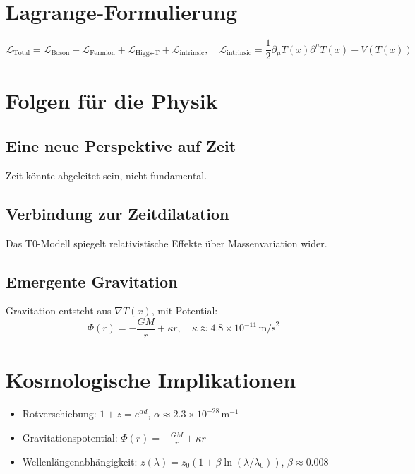 \documentclass{article}
\newcommand{\Tfield}{T(x)}
\begin{document}
	\section{Lagrange-Formulierung}
	\begin{equation}
		\mathcal{L}_{\text{Total}} = \mathcal{L}_{\text{Boson}} + \mathcal{L}_{\text{Fermion}} + \mathcal{L}_{\text{Higgs-T}} + \mathcal{L}_{\text{intrinsic}}, \quad \mathcal{L}_{\text{intrinsic}} = \frac{1}{2} \partial_\mu \Tfield \partial^\mu \Tfield - V(\Tfield)
	\end{equation}
	
	\section{Folgen für die Physik}
	\subsection{Eine neue Perspektive auf Zeit}
	Zeit könnte abgeleitet sein, nicht fundamental.
	\subsection{Verbindung zur Zeitdilatation}
	Das T0-Modell spiegelt relativistische Effekte über Massenvariation wider.
	\subsection{Emergente Gravitation}
	Gravitation entsteht aus \( \nabla \Tfield \), mit Potential:
	\begin{equation}
		\Phi(r) = -\frac{GM}{r} + \kappa r, \quad \kappa \approx 4.8 \times 10^{-11} \, \text{m/s}^2
	\end{equation}
	
	\section{Kosmologische Implikationen}
	\begin{itemize}
		\item Rotverschiebung: \( 1 + z = e^{\alpha d} \), \( \alpha \approx 2.3 \times 10^{-28} \, \text{m}^{-1} \)
		\item Gravitationspotential: \( \Phi(r) = -\frac{GM}{r} + \kappa r \)
		\item Wellenlängenabhängigkeit: \( z(\lambda) = z_0 (1 + \beta \ln(\lambda/\lambda_0)) \), \( \beta \approx 0.008 \)
	\end{itemize}
	
\end{document}
